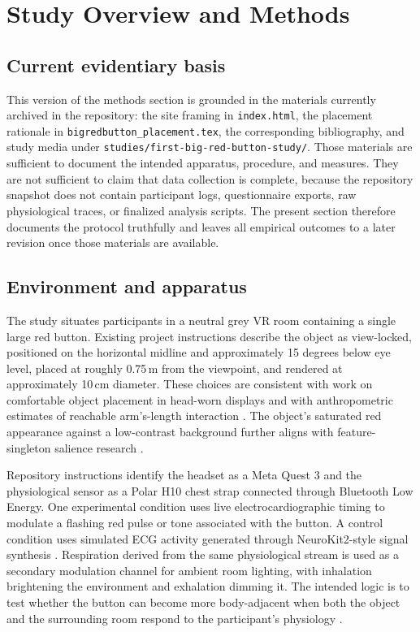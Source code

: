 \section{Study Overview and Methods}

\subsection{Current evidentiary basis}

This version of the methods section is grounded in the materials currently archived in the repository: the site framing in \texttt{index.html}, the placement rationale in \texttt{bigredbutton\_placement.tex}, the corresponding bibliography, and study media under \texttt{studies/first-big-red-button-study/}. Those materials are sufficient to document the intended apparatus, procedure, and measures. They are not sufficient to claim that data collection is complete, because the repository snapshot does not contain participant logs, questionnaire exports, raw physiological traces, or finalized analysis scripts. The present section therefore documents the protocol truthfully and leaves all empirical outcomes to a later revision once those materials are available.

\subsection{Environment and apparatus}

The study situates participants in a neutral grey VR room containing a single large red button. Existing project instructions describe the object as view-locked, positioned on the horizontal midline and approximately 15 degrees below eye level, placed at roughly 0.75\,m from the viewpoint, and rendered at approximately 10\,cm diameter. These choices are consistent with work on comfortable object placement in head-worn displays and with anthropometric estimates of reachable arm's-length interaction \citep{Lin2021,Mirbagheri2024,Bonin2022,Alghofaili2019,McNamara2019}. The object's saturated red appearance against a low-contrast background further aligns with feature-singleton salience research \citep{Li2008,CastellottiEtAl2022}.

Repository instructions identify the headset as a Meta Quest 3 and the physiological sensor as a Polar H10 chest strap connected through Bluetooth Low Energy. One experimental condition uses live electrocardiographic timing to modulate a flashing red pulse or tone associated with the button. A control condition uses simulated ECG activity generated through NeuroKit2-style signal synthesis \citep{MakowskiEtAl2021}. Respiration derived from the same physiological stream is used as a secondary modulation channel for ambient room lighting, with inhalation brightening the environment and exhalation dimming it. The intended logic is to test whether the button can become more body-adjacent when both the object and the surrounding room respond to the participant's physiology \citep{RockstrohEtAl2019,LueddeckeFelnhofer2022,ChittaroEtAl2024}.

